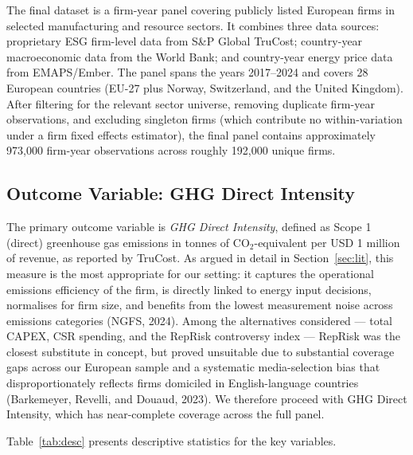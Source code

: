 \documentclass[12pt,a4paper]{article}
\begin{document}
The final dataset is a firm-year panel covering publicly listed European firms in selected manufacturing and resource sectors. It combines three data sources: proprietary ESG firm-level data from S\&P Global TruCost; country-year macroeconomic data from the World Bank; and country-year energy price data from EMAPS/Ember. The panel spans the years 2017–2024 and covers 28 European countries (EU-27 plus Norway, Switzerland, and the United Kingdom). After filtering for the relevant sector universe, removing duplicate firm-year observations, and excluding singleton firms (which contribute no within-variation under a firm fixed effects estimator), the final panel contains approximately 973,000 firm-year observations across roughly 192,000 unique firms.

\subsection{Outcome Variable: GHG Direct Intensity}

The primary outcome variable is \textit{GHG Direct Intensity}, defined as Scope 1 (direct) greenhouse gas emissions in tonnes of CO$_2$-equivalent per USD 1 million of revenue, as reported by TruCost. As argued in detail in Section~\ref{sec:lit}, this measure is the most appropriate for our setting: it captures the operational emissions efficiency of the firm, is directly linked to energy input decisions, normalises for firm size, and benefits from the lowest measurement noise across emissions categories (NGFS, 2024). Among the alternatives considered — total CAPEX, CSR spending, and the RepRisk controversy index — RepRisk was the closest substitute in concept, but proved unsuitable due to substantial coverage gaps across our European sample and a systematic media-selection bias that disproportionately reflects firms domiciled in English-language countries (Barkemeyer, Revelli, and Douaud, 2023). We therefore proceed with GHG Direct Intensity, which has near-complete coverage across the full panel.

Table~\ref{tab:desc} presents descriptive statistics for the key variables.
\end{document}
